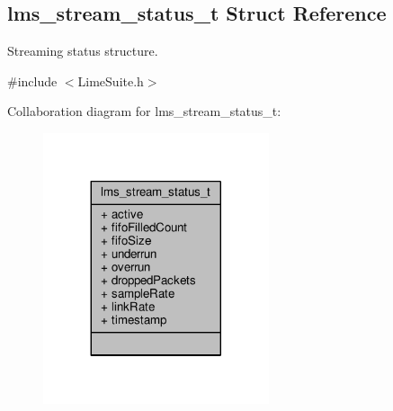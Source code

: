 \subsection{lms\+\_\+stream\+\_\+status\+\_\+t Struct Reference}
\label{structlms__stream__status__t}


Streaming status structure.  




{\ttfamily \#include $<$Lime\+Suite.\+h$>$}



Collaboration diagram for lms\+\_\+stream\+\_\+status\+\_\+t\+:
\nopagebreak
\begin{figure}[H]
\begin{center}
\leavevmode
\includegraphics[width=188pt]{d2/d0d/structlms__stream__status__t__coll__graph}
\end{center}
\end{figure}
